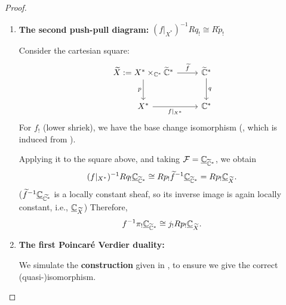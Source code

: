 \begin{proof}
\begin{enumerate}
        \item \textbf{The second push-pull diagram:} $(f|_{X^*})^{-1} Rq_! \cong R\widetilde{p}_!$

              Consider the cartesian square:
              \[
                  \begin{tikzcd}[row sep=2.5em, column sep=2.5em]
                      \widetilde{X} := X^* \times_{\C^*} \widetilde{\C}^* \arrow[r, "\widetilde{f}"] \arrow[d, "p"'] & \widetilde{\C}^* \arrow[d, "q"] \\
                      X^* \arrow[r, "f|_{X^*}"']                                                                 & \C^*
                  \end{tikzcd}
              \]
              For $f_!$ (lower shriek), we have the base change isomorphism (\cite[Proposition~C.2.1]{hotta2008d}, which is induced from \cite[Proposition~C.1.2]{hotta2008d}).

              Applying it to the square above, and taking $\mathcal{F} = \underline{\mathbb{C}}_{\widetilde{\mathbb{C}}^*}$, we obtain
              \[
                  (f|_{X^*})^{-1} Rq_! \underline{\mathbb{C}}_{\widetilde{\mathbb{C}}^*} \cong Rp_! \widetilde{f}^{-1} \underline{\mathbb{C}}_{\widetilde{\mathbb{C}}^*} = Rp_! \underline{\mathbb{C}}_{\widetilde{X}}.
              \]
              ($\widetilde{f}^{-1}\underline{\mathbb{C}}_{\widetilde{\mathbb{C}^*}}$ is a locally constant sheaf, so its inverse image is again locally constant, i.e., $\underline{\mathbb{C}}_{\widetilde{X}}$)
              Therefore,
              \[
                  f^{-1} \pi_! \underline{\mathbb{C}}_{\widetilde{\mathbb{C}}^*} \cong j_! Rp_! \underline{\mathbb{C}}_{\widetilde{X}}.
              \]

        \item \textbf{The first Poincar\'e Verdier duality:}

              We simulate the \textbf{construction} given in \cite[Section~3.1]{KashiwaraSchapira1994Sheaves}, to ensure we give the correct (quasi-)isomorphism.


\end{enumerate}
\end{proof}
